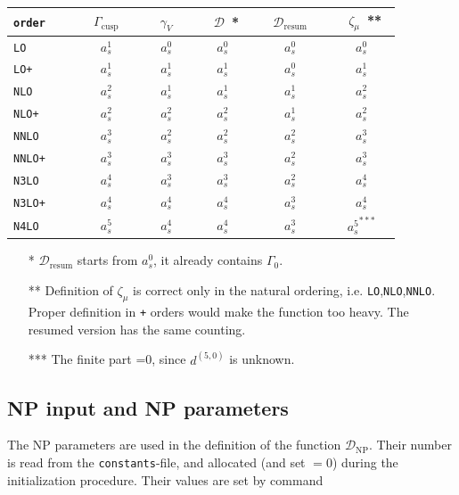\documentclass[prd,nofootinbib,eqsecnum,final]{revtex4}
\renewcommand{\(}{\left(}
\renewcommand{\)}{\right)}
\renewcommand{\[}{\left[}
\renewcommand{\]}{\right]}
\begin{document}
\begin{center}

\begin{tabular}{|l||c|c|c||c|| c}
\texttt{order}~~~ & ~~$\Gamma_{\text{cusp}}$~~ & ~~$\gamma_V$~~ & ~~$\mathcal{D}$~*~ & ~~$\mathcal{D}_{\text{resum}}$~~ & ~~$\zeta_\mu$~**~
\\\hline\hline
\texttt{LO} & $a_s^1$ & $a_s^0$ & $a_s^0$ & $a_s^0$ & $a_s^0$ 
\\\hline
\texttt{LO+} & $a_s^1$ & $a_s^1$ & $a_s^1$ & $a_s^0$ & $a_s^1$ 
\\\hline
\texttt{NLO} & $a_s^2$ & $a_s^1$ & $a_s^1$ & $a_s^1$ & $a_s^2$ 
\\\hline
\texttt{NLO+} & $a_s^2$ & $a_s^2$ & $a_s^2$ & $a_s^1$ & $a_s^2$ 
\\\hline
\texttt{NNLO} & $a_s^3$ & $a_s^2$ & $a_s^2$ & $a_s^2$ & $a_s^3$ 
\\\hline
\texttt{NNLO+} & $a_s^3$ & $a_s^3$ & $a_s^3$ & $a_s^2$ & $a_s^3$ 
\\\hline
\texttt{N3LO} & $a_s^4$ & $a_s^3$ & $a_s^3$ & $a_s^2$ & $a_s^4$ 
\\\hline
\texttt{N3LO+} & $a_s^4$ & $a_s^4$ & $a_s^4$ & $a_s^3$ & $a_s^4$ 
\\\hline
\texttt{N4LO} & $a_s^5$ & $a_s^4$ & $a_s^4$ & $a_s^3$ & ${a_s^5}^{***}$ 
\\\hline
\end{tabular}
\end{center}

\begin{itemize}
\item[*] $\mathcal{D}_{\text{resum}}$ starts from $a_s^0$, it already contains $\Gamma_0$.
\item[**] Definition of $\zeta_\mu$ is correct only in the natural ordering, i.e. \texttt{LO},\texttt{NLO},\texttt{NNLO}. Proper definition in \texttt{+} orders would make the function too heavy. The resumed version has the same counting.
\item[***] The finite part =0, since $d^{(5,0)}$ is unknown.
\end{itemize}

\subsection{NP input and NP parameters}
\label{TMDR:NP}

The NP parameters are used in the definition of the function $\mathcal{D}_\text{NP}$. Their number is read from the \texttt{constants}-file, and allocated (and set $=0$) during the initialization procedure. Their values are set by command
\end{document}
